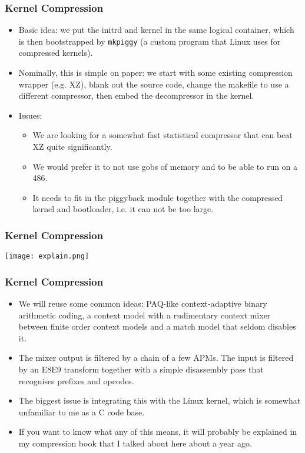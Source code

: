 \documentclass{beamer}
\begin{document}
\begin{frame}[t,fragile]
\frametitle{Kernel Compression}
  \begin{itemize}
    \item Basic idea: we put the initrd and kernel in the same logical container, which is then bootstrapped by \verb|mkpiggy| (a custom program that Linux uses for compressed kernels).
    \item Nominally, this is simple on paper: we start with some existing compression wrapper (e.g. XZ), blank out the source code, change the makefile to use a different compressor, then embed the decompressor in the kernel.
    \item Issues:
    \begin{itemize}
      \item We are looking for a somewhat fast statistical compressor that can beat XZ quite significantly.
      \item We would prefer it to not use gobs of memory and to be able to run on a 486.
      \item It needs to fit in the piggyback module together with the compressed kernel and bootloader, i.e. it can not be too large.
    \end{itemize}
  \end{itemize}
\end{frame}

\begin{frame}[t,fragile]
\frametitle{Kernel Compression}
\begin{center}
  \texttt{[image: explain.png]}
\end{center}
\end{frame}

\begin{frame}[t,fragile]
\frametitle{Kernel Compression}
  \begin{itemize}
    \item We will reuse some common ideas: PAQ-like context-adaptive binary arithmetic coding, a context model with a rudimentary context mixer between finite order context models and a match model that seldom disables it.
    \item The mixer output is filtered by a chain of a few APMs. The input is filtered by an E8E9 transform together with a simple disassembly pass that recognises prefixes and opcodes.
    \item The biggest issue is integrating this with the Linux kernel, which is somewhat unfamiliar to me as a C code base.
    \item If you want to know what any of this means, it will probably be explained in my compression book that I talked about here about a year ago.
  \end{itemize}
\end{frame}
\end{document}
